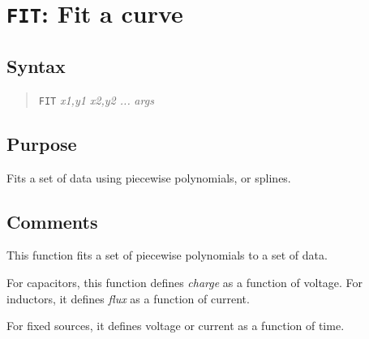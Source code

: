 %
%
%
%
\section{{\tt FIT}: Fit a curve}
\subsection{Syntax}
\begin{verse}
{\tt FIT} {\it x1,y1 x2,y2 ...} {\it args}
\end{verse}
\subsection{Purpose}

Fits a set of data using piecewise polynomials, or splines.
\subsection{Comments}

This function fits a set of piecewise polynomials to a set of data.

For capacitors, this function defines {\em charge} as a function of
voltage.  For inductors, it defines {\em flux} as a function of
current.

For fixed sources, it defines voltage or current as a function of
time.

